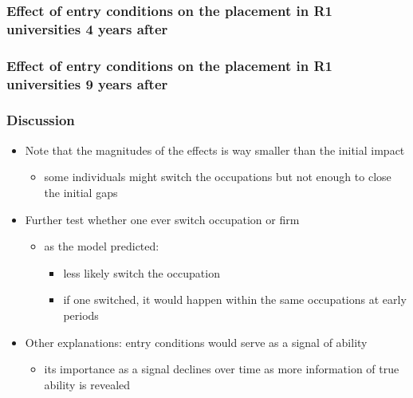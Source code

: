 \documentclass[11pt]{beamer}
\begin{document}
{
	\begin{frame}
		\frametitle{Effect of entry conditions on the placement in R1 universities 4 years after}
		
	\end{frame}
}

{
	\begin{frame}
		\frametitle{Effect of entry conditions on the placement in R1 universities 9 years after}
		
	\end{frame}
}


\begin{frame}[label = discussion]
	\frametitle{Discussion}
	\begin{itemize}
		\item Note that the magnitudes of the effects is way smaller than the initial impact
		\begin{itemize}
			\item some individuals might switch the occupations but not enough to close the initial gaps
		\end{itemize}
		\item Further test whether one ever switch occupation or firm   \hyperlink{mobility}{}
		\begin{itemize}
			\item as the model predicted:
			\begin{itemize}
				\item less likely switch the occupation
				\item if one switched, it would happen within the same occupations at early periods
			\end{itemize}
		\end{itemize} 
			\item Other explanations: entry conditions would serve as a signal of ability
			\begin{itemize}
				\item its importance as a signal declines over time as more information of true ability is revealed \hyperlink{signal}{}
			\end{itemize} 
	\end{itemize}
\end{frame}
\end{document}
